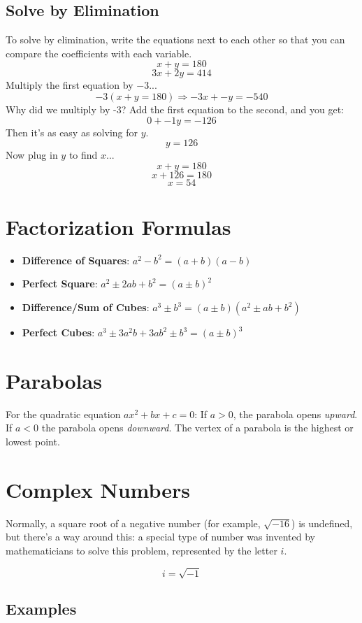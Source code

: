 \documentclass{article}
\begin{document}
\subsection{Solve by Elimination}
To solve by elimination, write the equations next to each other so that you can compare the coefficients with each variable.
$$x + y = 180$$
$$3x + 2y = 414$$
Multiply the first equation by $-3$...
$$-3(x + y = 180) \Rightarrow -3x + -y = -540$$
Why did we multiply by -3? Add the first equation to the second, and you get: 
$$0 + -1y = -126$$
Then it's as easy as solving for $y$.
$$y = 126$$
Now plug in $y$ to find $x$...
$$x + y = 180$$
$$x + 126 = 180$$
$$x = 54$$

\section{Factorization Formulas}
\begin{itemize}
	\item \textbf{Difference of Squares}: $a^2 - b^2 = (a + b)(a - b)$
	\item \textbf{Perfect Square}: $a^2 \pm 2ab + b^2 = (a \pm b)^2$
	\item \textbf{Difference/Sum of Cubes}: $a^3 \pm b^3 = (a \pm b)(a^2 \pm ab + b^2)$
	\item \textbf{Perfect Cubes}: $a^3 \pm 3a^2b + 3ab^2 \pm b^3 = (a \pm b)^3$
\end{itemize}

\section{Parabolas}
For the quadratic equation $ax^2 + bx + c = 0$:
If $a > 0$, the parabola opens \textit{upward}.
\noindent If $a < 0$ the parabola opens \textit{downward}.
\noindent The vertex of a parabola is the highest or lowest point.


\section{Complex Numbers}
Normally, a square root of a negative number (for example, $\sqrt{-16}$) is undefined, but there's a way around this: a special type of number was invented by mathematicians to solve this problem, represented by the letter $i$.

$$i = \sqrt{-1}$$

\subsection{Examples}
\end{document}
